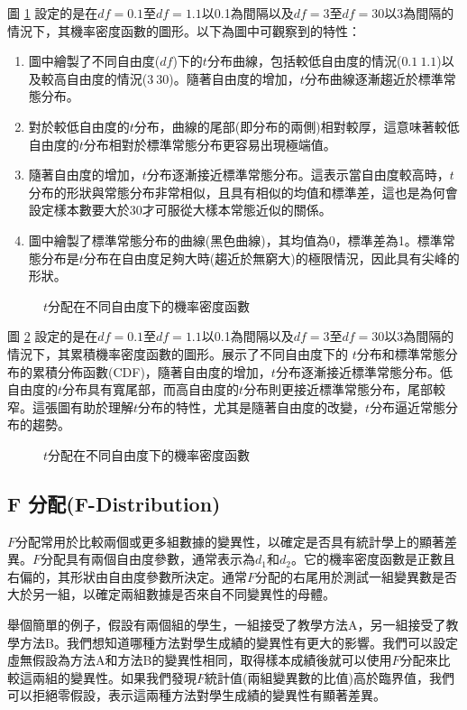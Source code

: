 \documentclass[12pt, a4paper]{article}
\begin{document}
圖 \ref{fig:t-distribution_pdf} 設定的是在$df=0.1$至$df=1.1$以0.1為間隔以及$df=3$至$df=30$以3為間隔的情況下，其機率密度函數的圖形。以下為圖中可觀察到的特性：
\begin{enumerate}
\item 圖中繪製了不同自由度($df$)下的$t$分布曲線，包括較低自由度的情況($0.1~1.1$)以及較高自由度的情況($3~30$)。隨著自由度的增加，$t$分布曲線逐漸趨近於標準常態分布。
\item 對於較低自由度的$t$分布，曲線的尾部(即分布的兩側)相對較厚，這意味著較低自由度的$t$分布相對於標準常態分布更容易出現極端值。
\item 隨著自由度的增加，$t$分布逐漸接近標準常態分布。這表示當自由度較高時，$t$分布的形狀與常態分布非常相似，且具有相似的均值和標準差，這也是為何會設定樣本數要大於30才可服從大樣本常態近似的關係。
\item 圖中繪製了標準常態分布的曲線(黑色曲線)，其均值為0，標準差為1。標準常態分布是$t$分布在自由度足夠大時(趨近於無窮大)的極限情況，因此具有尖峰的形狀。
\end{enumerate}
\begin{figure}[h]
    \caption{$t$分配在不同自由度下的機率密度函數}
    \label{fig:t-distribution_pdf}
\end{figure}
圖 \ref{fig:t-distribution_cdf} 設定的是在$df=0.1$至$df=1.1$以0.1為間隔以及$df=3$至$df=30$以3為間隔的情況下，其累積機率密度函數的圖形。展示了不同自由度下的 $t$分布和標準常態分布的累積分佈函數(CDF)，隨著自由度的增加，$t$分布逐漸接近標準常態分布。低自由度的$t$分布具有寬尾部，而高自由度的$t$分布則更接近標準常態分布，尾部較窄。這張圖有助於理解$t$分布的特性，尤其是隨著自由度的改變，$t$分布逼近常態分布的趨勢。
\begin{figure}[h]
    \caption{$t$分配在不同自由度下的機率密度函數}
    \label{fig:t-distribution_cdf}
\end{figure}
\subsection{F 分配(F-Distribution)}
$F$分配常用於比較兩個或更多組數據的變異性，以確定是否具有統計學上的顯著差異。$F$分配具有兩個自由度參數，通常表示為$d_1$和$d_2$。它的機率密度函數是正數且右偏的，其形狀由自由度參數所決定。通常$F$分配的右尾用於測試一組變異數是否大於另一組，以確定兩組數據是否來自不同變異性的母體。

舉個簡單的例子，假設有兩個組的學生，一組接受了教學方法A，另一組接受了教學方法B。我們想知道哪種方法對學生成績的變異性有更大的影響。我們可以設定虛無假設為方法A和方法B的變異性相同，取得樣本成績後就可以使用$F$分配來比較這兩組的變異性。如果我們發現$F$統計值(兩組變異數的比值)高於臨界值，我們可以拒絕零假設，表示這兩種方法對學生成績的變異性有顯著差異。
\end{document}
